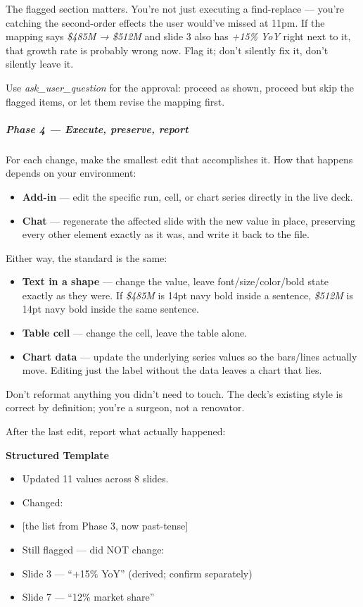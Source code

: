 \documentclass[11pt]{article}
\begin{document}
The flagged section matters. You're not just executing a find-replace — you're catching the second-order effects the user would've missed at 11pm. If the mapping says \emph{\$485M → \$512M} and slide 3 also has \emph{+15\% YoY} right next to it, that growth rate is probably wrong now. Flag it; don't silently fix it, don't silently leave it.


Use \emph{ask\_\allowbreak{}user\_\allowbreak{}question} for the approval: proceed as shown, proceed but skip the flagged items, or let them revise the mapping first.


\subparagraph{Phase 4 — Execute, preserve, report}\mbox{}\par

For each change, make the smallest edit that accomplishes it. How that happens depends on your environment:


\begin{itemize}[leftmargin=*,itemsep=2pt,topsep=2pt]
\item {} \textbf{Add-in} — edit the specific run, cell, or chart series directly in the live deck.
\item {} \textbf{Chat} — regenerate the affected slide with the new value in place, preserving every other element exactly as it was, and write it back to the file.
\end{itemize}

Either way, the standard is the same:


\begin{itemize}[leftmargin=*,itemsep=2pt,topsep=2pt]
\item {} \textbf{Text in a shape} — change the value, leave font/size/color/bold state exactly as they were. If \emph{\$485M} is 14pt navy bold inside a sentence, \emph{\$512M} is 14pt navy bold inside the same sentence.
\item {} \textbf{Table cell} — change the cell, leave the table alone.
\item {} \textbf{Chart data} — update the underlying series values so the bars/lines actually move. Editing just the label without the data leaves a chart that lies.
\end{itemize}

Don't reformat anything you didn't need to touch. The deck's existing style is correct by definition; you're a surgeon, not a renovator.


After the last edit, report what actually happened:


\textbf{Structured Template}
\begin{itemize}[leftmargin=*,itemsep=2pt,topsep=2pt]
\item {} Updated 11 values across 8 slides.
\item {} Changed:
\item {} [the list from Phase 3, now past-tense]
\item {} Still flagged — did NOT change:
\item {} Slide 3 — ``+15\% YoY'' (derived; confirm separately)
\item {} Slide 7 — ``12\% market share''
\end{itemize}
\end{document}
